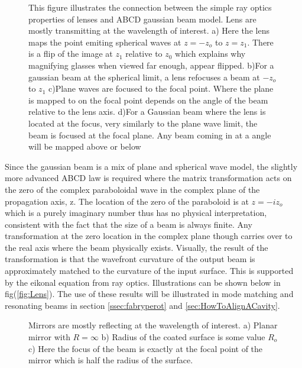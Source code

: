 \documentclass[a4paper]{book}
\newcommand{\imginput}[1]{} %
\begin{document}
		\begin{figure} [!ht]
			\centering
			\def\svgwidth{\columnwidth}
			\resizebox{160mm}{!}{\imginput{images/lens-reimage-focus.pdf_tex}}
			\caption{
				This figure illustrates the connection between the simple ray optics properties of lenses and ABCD gaussian beam model. Lens are mostly transmitting at the wavelength of interest.
				\newline 
				a) Here the lens maps the point emiting spherical waves at $z=-z_o$ to $z=z_1$. There is a flip of the image at $z_1$ relative to $z_0$ which explains why magnifying glasses when viewed far enough, appear flipped.
				\newline
				b)For a gaussian beam at the spherical limit, a lens refocuses a beam at $-z_o$ to $z_1$
				\newline
				c)Plane waves are focused to the focal point. Where the plane is mapped to on the focal point depends on the angle of the beam relative to the lens axis.
				\newline
				d)For a Gaussian beam where the lens is located at the focus, very similarly to the plane wave limit, the beam is focused at the focal plane. Any beam coming in at a angle will be mapped above or below}
			\label{fig:lens-reimage-focus}
		\end{figure}
		
		Since the gaussian beam is a mix of plane and spherical wave model, the slightly more advanced ABCD law is required where the matrix transformation acts on the zero of the complex paraboloidal wave in the complex plane of the propagation axis, z.
		The location of the zero of the paraboloid is at $z=-iz_o$ which is a purely imaginary number thus has no physical interpretation, consistent with the fact that the size of a beam is always finite.
		Any transformation at the zero location in the complex plane though carries over to the real axis where the beam physically exists.
		Visually, the result of the transformation is that the wavefront curvature of the output beam is approximately matched to the curvature of the input surface.
		This is supported by the eikonal equation from ray optics. \cite{SalehTeichs}
		Illustrations can be shown below in fig(\ref{fig:Lens}). 
		The use of these results will be illustrated in mode matching and resonating beams in section \ref{ssec:fabryperot} and \ref{sec:HowToAlignACavity}.
		
		\begin{figure} [!ht]
			\centering
			\def\svgwidth{\columnwidth}
			\resizebox{160mm}{!}{\imginput{images/Mirrors.pdf_tex}}
			\caption{\cite{SalehTeichs} Mirrors are mostly reflecting at the wavelength of interest.
				a) Planar mirror with $R=\infty$ \quad b) Radius of the coated surface is some value $R_o$ \quad c) Here the focus of the beam is exactly at the focal point of the mirror which is half the radius of the surface.
			}
			\label{fig:Mirrors}
		\end{figure}	
		
\end{document}
